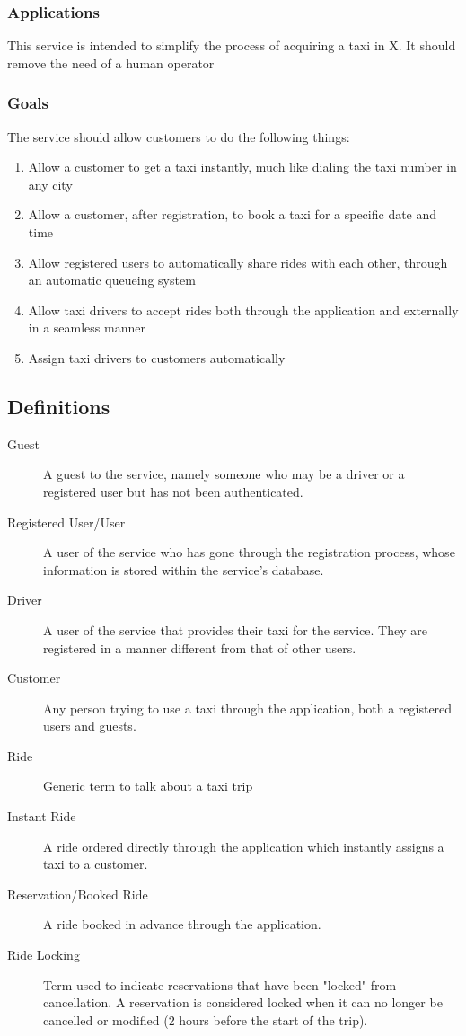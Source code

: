 	\subsubsection{Applications}
		This service is intended to simplify the process of acquiring a taxi in X. It should remove the need of a human operator
	\subsubsection{Goals}
		The service should allow customers to do the following things:
		\begin{enumerate}
		\item Allow a customer to get a taxi instantly, much like dialing the taxi number in any city
		\item Allow a customer, after registration, to book a taxi for a specific date and time
		\item Allow registered users to automatically share rides with each other, through an automatic queueing system
		\item Allow taxi drivers to accept rides both through the application and externally in a seamless manner
		\item Assign taxi drivers to customers automatically 
		\end{enumerate}
			
\subsection{Definitions}
	\begin{description}
		\item[Guest]
			A guest to the service, namely someone who may be a driver or a registered user but has not been authenticated.
		\item[Registered User/User]
			A user of the service who has gone through the registration process, whose information is stored within the service's database.
		\item[Driver]
			A user of the service that provides their taxi for the service. They are registered in a manner different from that of other users.
		\item[Customer]
			Any person trying to use a taxi through the application, both a registered users and guests.
		\item[Ride]
			Generic term to talk about a taxi trip
		\item[Instant Ride]
			A ride ordered directly through the application which instantly assigns a taxi to a customer.
		\item[Reservation/Booked Ride]
			A ride booked in advance through the application.
		\item[Ride Locking]
			Term used to indicate reservations that have been "locked" from cancellation. A reservation is considered locked when it can no 
			longer be cancelled or modified (2 hours before the start of the trip).
	\end{description}

